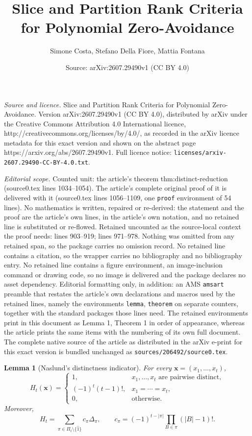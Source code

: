 \documentclass[10pt,a4paper]{amsart}
\title{Slice and Partition Rank Criteria for Polynomial Zero-Avoidance}
\author{Simone Costa, Stefano Della Fiore, Mattia Fontana}
\date{Source: arXiv:2607.29490v1 (CC BY 4.0)}
\newtheorem{lemma}{Lemma}
\begin{document}
\maketitle

\noindent\emph{Source and licence.} Slice and Partition Rank Criteria for Polynomial Zero-Avoidance. Version arXiv:2607.29490v1 (CC BY 4.0), distributed by arXiv under the Creative Commons Attribution 4.0 International licence, http://creativecommons.org/licenses/by/4.0/, as recorded in the arXiv licence metadata for this exact version and shown on the abstract page https://arxiv.org/abs/2607.29490v1. Full licence notice: \texttt{licenses/arxiv-2607.29490-CC-BY-4.0.txt}.\par\smallskip

\noindent\textit{Editorial scope.} Counted unit: the article's theorem thm:distinct-reduction (source0.tex lines 1034--1054). The article's complete original proof of it is delivered with it (source0.tex lines 1056--1109, one \texttt{proof} environment of 54 lines). No mathematics is written, repaired or re-derived: the statement and the proof are the article's own lines, in the article's own notation, and no retained line is substituted or re-flowed.  Retained uncounted as the source-local context the proof needs: lines 903--919; lines 971--978.  Nothing was omitted from any retained span, so the package carries no omission record.  No retained line contains a citation, so the wrapper carries no bibliography and no bibliography entry.  No retained line contains a figure environment, an image-inclusion command or drawing code, so no image is delivered and the package declares no asset dependency.  Editorial formatting only, in addition: an AMS \texttt{amsart} preamble that restates the article's own declarations and macros used by the retained lines, namely the environments \texttt{lemma}, \texttt{theorem} on separate counters, together with the standard packages those lines need.  The retained environments print in this document as Lemma 1, Theorem 1 in order of appearance, whereas the article prints the same items with the numbering of its own full document.  The complete native source of the article as distributed in the arXiv e-print for this exact version is bundled unchanged as \texttt{sources/206492/source0.tex}.
\begin{lemma}[Naslund's distinctness indicator]\label{lem:naslund-indicator}
For every $\mathbf x=(x_1,\ldots,x_t)$,
\[
 H_t(\mathbf x)=
 \begin{cases}
 1,&x_1,\ldots,x_t\text{ are pairwise distinct},\\
 (-1)^t(t-1)!,&x_1=\cdots=x_t,\\
 0,&\text{otherwise}.
 \end{cases}
\]
Moreover,
\[
 H_t=\sum_{\pi\in\Pi_t\setminus\{\widehat1\}}c_\pi\Delta_\pi,
\qquad
 c_\pi=(-1)^{t-|\pi|}\prod_{B\in\pi}(|B|-1)!.
\]
\end{lemma}
\end{document}
